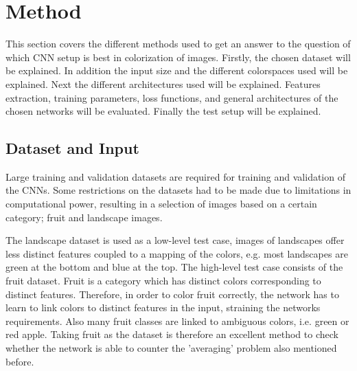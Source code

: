 \section{Method} \label{sec:method}
%
%
%
%

This section covers the different methods used to get an answer to the question of which CNN setup is best in colorization of images. Firstly, the chosen dataset will be explained. In addition the input size and the different colorspaces used will be explained. Next the different architectures used will be explained. Features extraction, training parameters, loss functions, and general architectures of the chosen networks will be evaluated. Finally the test setup will be explained.

\subsection{Dataset and Input}

Large training and validation datasets are required for training and validation of the CNNs.
Some restrictions on the datasets had to be made due to limitations in computational power, resulting in a selection of images based on a certain category; fruit and landscape images.

The landscape dataset is used as a low-level test case, images of landscapes offer less distinct features coupled to a mapping of the colors, e.g. most landscapes are green at the bottom and blue at the top. The high-level test case consists of the fruit dataset.
Fruit is a category which has distinct colors corresponding to distinct features. Therefore, in order to color fruit correctly, the network has to learn to link colors to distinct features in the input, straining the networks requirements. Also many fruit classes are linked to ambiguous colors, i.e. green or red apple. Taking fruit as the dataset is therefore an excellent method to check whether the network is able to counter the 'averaging' problem also mentioned before.

